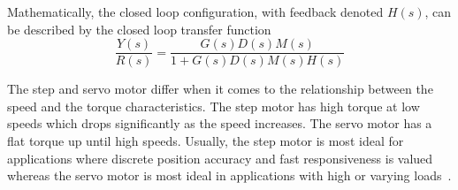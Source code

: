 Mathematically, the closed loop configuration, with feedback denoted $H(s)$, can be described by the closed loop transfer function
\begin{equation}
    \frac{Y(s)}{R(s)} = \frac{G(s)D(s)M(s)}{1+G(s)D(s)M(s)H(s)}
\end{equation}

The step and servo motor differ when it comes to the relationship between the speed and the torque characteristics. The step motor has high torque at low speeds which drops significantly as the speed increases. The servo motor has a flat torque up until high speeds. Usually, the step motor is most ideal for applications where discrete position accuracy and fast responsiveness is valued whereas the servo motor is most ideal in applications with high or varying loads~\cite{servo_step}.